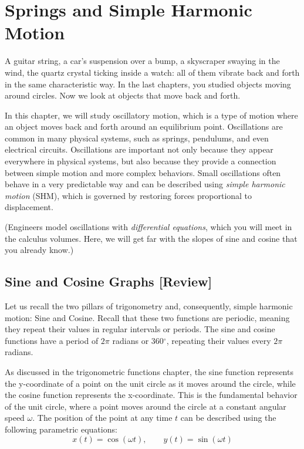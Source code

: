 \chapter{Springs and Simple Harmonic Motion}
A guitar string, a car's suspension over a bump, a skyscraper swaying in
the wind, the quartz crystal ticking inside a watch: all of them vibrate
back and forth in the same characteristic way. In the last chapters, you
studied objects moving around circles. Now we look at objects that move back
and forth.

In this chapter, we will study oscillatory motion, which is a type of motion
where an object moves back and forth around an equilibrium point. Oscillations are
common in many physical systems, such as springs, pendulums, and even electrical
circuits. Oscillations are important not only because they appear everywhere in physical
systems, but also because they provide a connection between simple motion and
more complex behaviors. Small oscillations often behave in a very predictable way
and can be described using \emph{simple harmonic motion} (SHM), which is governed
by restoring forces proportional to displacement.

(Engineers model oscillations with \emph{differential equations}, which you
will meet in the calculus volumes. Here, we will get far with the slopes of
sine and cosine that you already know.)

\section{Sine and Cosine Graphs [Review]}
Let us recall the two pillars of trigonometry and, consequently, simple harmonic motion:
Sine and Cosine. Recall that these two functions are periodic, meaning they
repeat their values in regular intervals or periods. The sine and cosine functions
have a period of $2\pi$ radians or 360$^{\circ}$, repeating their values every $2
\pi$ radians.

As discussed in the trigonometric functions chapter, the sine function represents the y-coordinate
of a point on the unit circle as it moves around the circle, while the cosine function
represents the x-coordinate. This is the fundamental behavior of the unit circle,
where a point moves around the circle at a constant angular speed $\omega$. The
position of the point at any time $t$ can be described using the following
parametric equations:
\[
	x(t) = \cos(\omega t), \qquad y(t) = \sin(\omega t)
\]

